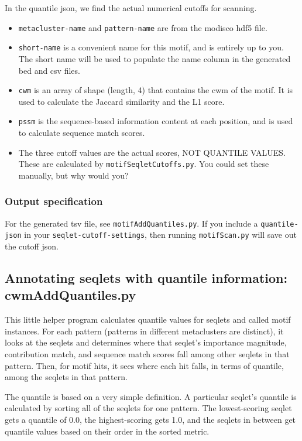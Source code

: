 \documentclass{article}
\begin{document}
In the quantile json, we find the actual numerical cutoffs for scanning.
\begin{itemize}
    \item \texttt{metacluster-name} and \texttt{pattern-name} are from the modisco hdf5 file.
    \item \texttt{short-name} is a convenient name for this motif, and is entirely up to you.
        The short name will be used to populate the name column in the generated bed and csv files.
    \item \texttt{cwm} is an array of shape (length, 4) that contains the cwm of the motif.
        It is used to calculate the Jaccard similarity and the L1 score.
    \item \texttt{pssm} is the sequence-based information content at each position, and is
        used to calculate sequence match scores.
    \item The three cutoff values are the actual scores, NOT QUANTILE VALUES.
        These are calculated by \texttt{motifSeqletCutoffs.py}. You could set these
        manually, but why would you? 
\end{itemize}

\subsubsection{Output specification}
For the generated tsv file, see \texttt{motifAddQuantiles.py}.
If you include a \texttt{quantile-json} in your \texttt{seqlet-cutoff-settings}, then
running \texttt{motifScan.py} will save out the cutoff json.

\subsection{Annotating seqlets with quantile information: {cwmAddQuantiles.py}}

This little helper program calculates quantile values for seqlets and called motif instances.
For each pattern (patterns in different metaclusters are distinct), it looks at the seqlets
and determines where that seqlet's importance magnitude, contribution match, and sequence match scores
fall among other seqlets in that pattern.
Then, for motif hits, it sees where each hit falls, in terms of quantile, among the seqlets
in that pattern.

The quantile is based on a very simple definition. A particular seqlet's quantile is calculated by
sorting all of the seqlets for one pattern. The lowest-scoring seqlet gets a quantile of 0.0,
the highest-scoring gets 1.0, and the seqlets in between get quantile values based on their
order in the sorted metric.
\end{document}
